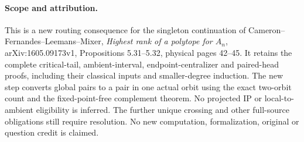 \documentclass[11pt,a4paper]{article}
\begin{document}
\paragraph{Scope and attribution.}
This is a new routing consequence for the singleton continuation of
Cameron--Fernandes--Leemans--Mixer, \emph{Highest rank of a polytope
for $A_n$}, arXiv:1605.09173v1, Propositions 5.31--5.32,
physical pages 42--45. It retains the complete critical-tail,
ambient-interval, endpoint-centralizer and paired-head proofs,
including their classical inputs and smaller-degree induction.
The new step converts global pairs to a pair in one actual orbit
using the exact two-orbit count and the fixed-point-free complement
theorem. No projected IP or local-to-ambient eligibility is inferred.
The further unique crossing and other full-source obligations still
require resolution. No new computation, formalization, original or
question credit is claimed.
\end{document}
